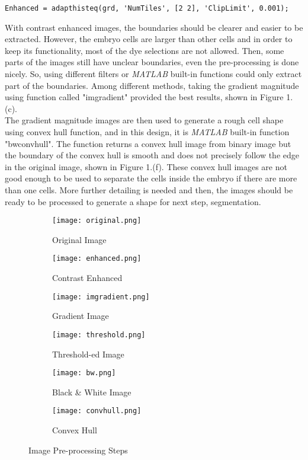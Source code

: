 \documentclass[12pt]{article}
\begin{document}
\begin{verbatim}
Enhanced = adapthisteq(grd, 'NumTiles', [2 2], 'ClipLimit', 0.001);
\end{verbatim}

\noindent \qquad With contrast enhanced images, the boundaries should be clearer and easier to be extracted. However, the embryo cells are larger than other cells and in order to keep its functionality, most of the dye selections are not allowed. Then, some parts of the images still have unclear boundaries, even the pre-processing is done nicely. So, using different filters or \textit{MATLAB} built-in functions could only extract part of the boundaries. Among different methods, taking the gradient magnitude using function called "imgradient" provided the best results, shown in Figure 1.(c). \\

\noindent \qquad The gradient magnitude images are then used to generate a rough cell shape using convex hull function, and in this design, it is \textit{MATLAB} built-in function "bwconvhull". The function returns a convex hull image from binary image but the boundary of the convex hull is smooth and does not precisely follow the edge in the original image, shown in Figure 1.(f). These convex hull images are not good enough to be used to separate the cells inside the embryo if there are more than one cells. More further detailing is needed and then, the images should be ready to be processed to generate a shape for next step, segmentation.

\begin{figure}[h!]
	\centering
    \begin{subfigure}[b]{0.25\textwidth}
    	\texttt{[image: original.png]}
        \caption{Original Image}
        \label{fig:original}
	\end{subfigure}
    \begin{subfigure}[b]{0.25\textwidth}
    	\texttt{[image: enhanced.png]}
        \caption{Contrast Enhanced}
        \label{fig:enhanced}
	\end{subfigure}
    \begin{subfigure}[b]{0.25\textwidth}
    	\texttt{[image: imgradient.png]}
        \caption{Gradient Image}
        \label{fig:gradient}
	\end{subfigure}
    \begin{subfigure}[b]{0.25\textwidth}
    	\texttt{[image: threshold.png]}
        \caption{Threshold-ed Image}
        \label{fig:Threshold}
	\end{subfigure}
    \begin{subfigure}[b]{0.25\textwidth}
    	\texttt{[image: bw.png]}
        \caption{Black \& White Image}
        \label{fig:bw}
	\end{subfigure}
    \begin{subfigure}[b]{0.25\textwidth}
    	\texttt{[image: convhull.png]}
        \caption{Convex Hull}
        \label{fig:convhull}
	\end{subfigure}
    \caption{Image Pre-processing Steps}\label{fig:Progress}
\end{figure}
\end{document}
